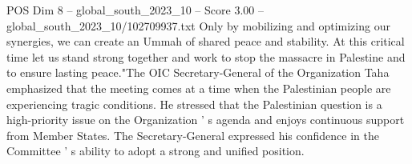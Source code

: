 \begin{textsample}{POS Dim 8 – global\_south\_2023\_10 – Score 3.00 – global\_south\_2023\_10/102709937.txt}
Only by mobilizing and optimizing our synergies, we can create an Ummah of shared peace and stability.
At this critical time let us stand strong together and work to stop the massacre in Palestine and to ensure lasting peace."The OIC Secretary-General of the Organization Taha emphasized that the meeting comes at a time when the Palestinian people are experiencing tragic conditions.
He stressed that the Palestinian question is a high-priority issue on the Organization ' s agenda and enjoys continuous support from Member States.
The Secretary-General expressed his confidence in the Committee ' s ability to adopt a strong and unified position.

\end{textsample}

